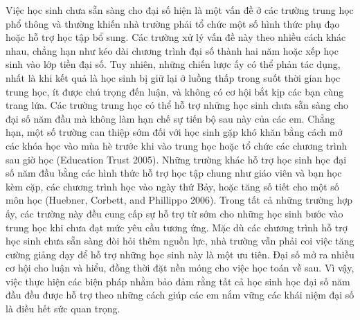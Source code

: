 \documentclass[
  10pt,
  a4paper,
  landscape,
  twoside,
  openany
]{scrbook}
\newcommand{\VI}[1]{#1}
\newcommand{\NOTE}[1]{#1}
\begin{document}
{
\VI{Việc học sinh chưa sẵn sàng cho đại số hiện là một vấn đề ở các trường trung học phổ thông và thường khiến nhà trường phải tổ chức một số hình thức phụ đạo hoặc hỗ trợ học tập bổ sung. Các trường xử lý vấn đề này theo nhiều cách khác nhau, chẳng hạn như kéo dài chương trình đại số thành hai năm hoặc xếp học sinh vào lớp tiền đại số. Tuy nhiên, những chiến lược ấy có thể phản tác dụng, nhất là khi kết quả là học sinh bị giữ lại ở luồng thấp trong suốt thời gian học trung học, ít được chú trọng đến luận, và không có cơ hội bắt kịp các bạn cùng trang lứa. Các trường trung học có thể hỗ trợ những học sinh chưa sẵn sàng cho đại số năm đầu mà không làm hạn chế sự tiến bộ sau này của các em. Chẳng hạn, một số trường can thiệp sớm đối với học sinh gặp khó khăn bằng cách mở các khóa học vào mùa hè trước khi vào trung học hoặc tổ chức các chương trình sau giờ học (Education Trust 2005). Những trường khác hỗ trợ học sinh học đại số năm đầu bằng các hình thức hỗ trợ học tập chung như giáo viên và bạn học kèm cặp, các chương trình học vào ngày thứ Bảy, hoặc tăng số tiết cho một số môn học (Huebner, Corbett, and Phillippo 2006). Trong tất cả những trường hợp ấy, các trường này đều cung cấp sự hỗ trợ từ sớm cho những học sinh bước vào trung học khi chưa đạt mức yêu cầu tương ứng. Mặc dù các chương trình hỗ trợ học sinh chưa sẵn sàng đòi hỏi thêm nguồn lực, nhà trường vẫn phải coi việc tăng cường giảng dạy để hỗ trợ những học sinh này là một ưu tiên. Đại số mở ra nhiều cơ hội cho luận và hiểu, đồng thời đặt nền móng cho việc học toán về sau. Vì vậy, việc thực hiện các biện pháp nhằm bảo đảm rằng tất cả học sinh học đại số năm đầu đều được hỗ trợ theo những cách giúp các em nắm vững các khái niệm đại số là điều hết sức quan trọng.}
}
{
\NOTE{}
}
\end{document}
